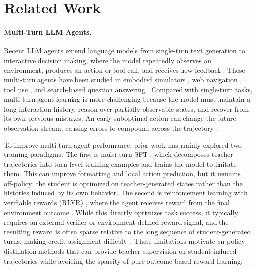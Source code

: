 \section{Related Work}
\label{sec:related_work}

\paragraph{Multi-Turn LLM Agents.}
Recent LLM agents extend language models from single-turn text generation to interactive decision making, where the model repeatedly observes an environment, produces an action or tool call, and receives new feedback \citep{yao2022react, yang2024swe, chan2025mle}. These multi-turn agents have been studied in embodied simulators \citep{shridhar2020alfworld}, web navigation \citep{gur2024real, team2025tongyi}, tool use \citep{yao2024tau}, and search-based question answering \citep{jin2025search}. Compared with single-turn tasks, multi-turn agent learning is more challenging because the model must maintain a long interaction history, reason over partially observable states, and recover from its own previous mistakes. An early suboptimal action can change the future observation stream, causing errors to compound across the trajectory \citep{zhang2025agentracer}.

To improve multi-turn agent performance, prior work has mainly explored two training paradigms. The first is multi-turn SFT \citep{teng2024fine, li2025beyond}, which decomposes teacher trajectories into turn-level training examples and trains the model to imitate them. This can improve formatting and local action prediction, but it remains off-policy: the student is optimized on teacher-generated states rather than the histories induced by its own behavior. The second is reinforcement learning with verifiable rewards (RLVR) \citep{shao2024deepseekmath}, where the agent receives reward from the final environment outcome \citep{deepswe2025, wei2025webagent}. While this directly optimizes task success, it typically requires an external verifier or environment-defined reward signal, and the resulting reward is often sparse relative to the long sequence of student-generated turns, making credit assignment difficult~\citep{wang2026openclaw}. These limitations motivate on-policy distillation methods that can provide teacher supervision on student-induced trajectories while avoiding the sparsity of pure outcome-based reward learning.

